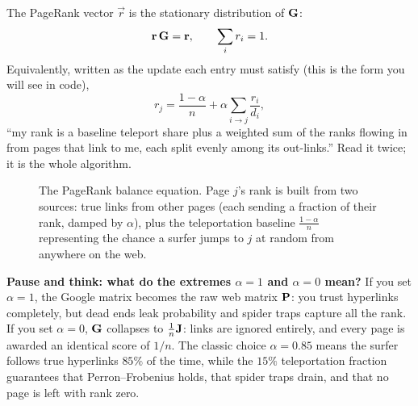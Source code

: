 The PageRank vector $\vec{r}$ is the stationary distribution of $\mathbf{G}$:
\[
\mathbf{r}\,\mathbf{G} = \mathbf{r}, \qquad \sum_i r_i = 1.
\]
Equivalently, written as the update each entry must satisfy (this is the form you will see
in code),
\[
r_j = \frac{1-\alpha}{n} + \alpha \sum_{i \to j} \frac{r_i}{d_i},
\]
``my rank is a baseline teleport share plus a weighted sum of the ranks flowing in from
pages that link to me, each split evenly among its out-links.'' Read it twice; it is the
whole algorithm.

\begin{figure}[htbp]
\centering
{}
\caption{The PageRank balance equation. Page $j$'s rank is built from two sources: true links from other pages (each sending a fraction of their rank, damped by $\alpha$), plus the teleportation baseline $\frac{1-\alpha}{n}$ representing the chance a surfer jumps to $j$ at random from anywhere on the web.}
\label{ch35:fig-pagerank-balance}
\end{figure}

\begin{recoverybox}
\textbf{Pause and think: what do the extremes $\alpha = 1$ and $\alpha = 0$ mean?}
If you set $\alpha = 1$, the Google matrix becomes the raw web matrix $\mathbf{P}$: you trust
hyperlinks completely, but dead ends leak probability and spider traps capture all the rank.
If you set $\alpha = 0$, $\mathbf{G}$ collapses to $\tfrac{1}{n}\mathbf{J}$: links are ignored
entirely, and every page is awarded an identical score of $1/n$. The classic choice
$\alpha = 0.85$ means the surfer follows true hyperlinks $85\%$ of the time, while the
$15\%$ teleportation fraction guarantees that Perron--Frobenius holds, that spider traps
drain, and that no page is left with rank zero.
\end{recoverybox}

